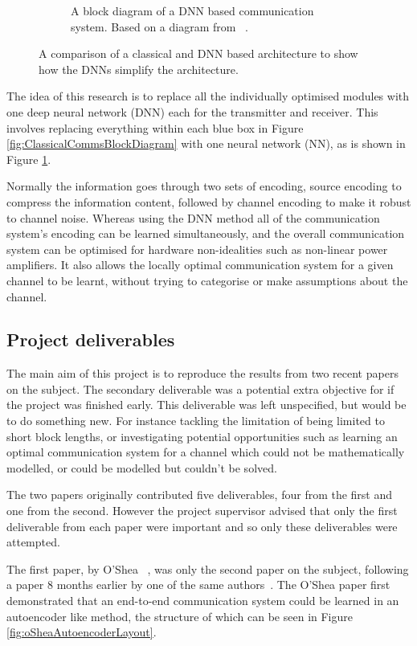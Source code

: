 \documentclass[12pt,onecolumn,letterpaper]{article}
\begin{document}
\begin{figure}[t!]
\begin{subfigure}[t]{0.45\textwidth}
       \caption{A block diagram of a DNN based communication system. Based on a diagram from ~\cite{EE3CommsSystemsNotesL4}.}
       \label{fig:DNNCommsBlockDiagram}
   \end{subfigure}
   \caption{A comparison of a classical and DNN based architecture to show how the DNNs simplify the architecture.}
   \label{fig:tSneConstellationDiags}
\end{figure}


The idea of this research is to replace all the individually optimised modules with one deep neural network (DNN) each for the transmitter and receiver. This involves replacing everything within each blue box in Figure \ref{fig:ClassicalCommsBlockDiagram} with one neural network (NN), as is shown in Figure \ref{fig:DNNCommsBlockDiagram}. 

Normally the information goes through two sets of encoding, source encoding to compress the information content, followed by channel encoding to make it robust to channel noise. Whereas using the DNN method all of the communication system's encoding can be learned simultaneously, and the overall communication system can be optimised for hardware non-idealities such as non-linear power amplifiers. It also allows the locally optimal communication system for a given channel to be learnt, without trying to categorise or make assumptions about the channel.

\subsection{Project deliverables}

The main aim of this project is to reproduce the results from two recent papers ~\cite{oShea,Aoudia} on the subject. The secondary deliverable was a potential extra objective for if the project was finished early. This deliverable was left unspecified, but would be to do something new. For instance tackling the limitation of being limited to short block lengths, or investigating potential opportunities such as learning an optimal communication system for a channel which could not be mathematically modelled, or could be modelled but couldn't be solved.

The two papers originally contributed five deliverables, four from the first and one from the second. However the project supervisor advised that only the first deliverable from each paper were important and so only these deliverables were attempted. 

The first paper, by O'Shea \etal~\cite{oShea}, was only the second paper on the subject, following a paper 8 months earlier by one of the same authors~\cite{oShea0}. The O'Shea paper first demonstrated that an end-to-end communication system could be learned in an autoencoder like method, the structure of which can be seen in Figure \ref{fig:oSheaAutoencoderLayout}. 
\end{document}
